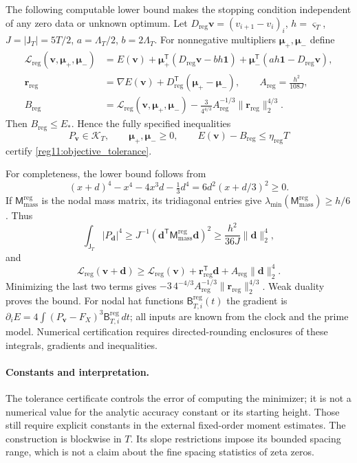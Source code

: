 The following computable lower bound makes the stopping condition
independent of any zero data or unknown optimum. Let
$D_{\mathrm{reg}}\mathbf v=(v_{i+1}-v_i)_i$, $h=\varsigma_T$,
$J=|\mathsf J_T|=5T/2$, $a=\Lambda_T/2$, $b=2\Lambda_T$.
For nonnegative multipliers $\boldsymbol\mu_+,\boldsymbol\mu_-$ define
\begin{equation}
\begin{split}
\mathscr L_{\mathrm{reg}}(\mathbf v,\boldsymbol\mu_+,\boldsymbol\mu_-)
&=E(\mathbf v)+\boldsymbol\mu_+^{\mathsf T}(D_{\mathrm{reg}}\mathbf v-bh\mathbf1)
+\boldsymbol\mu_-^{\mathsf T}(ah\mathbf1-D_{\mathrm{reg}}\mathbf v),\\
\mathbf r_{\mathrm{reg}}&=\nabla E(\mathbf v)+D_{\mathrm{reg}}^{\mathsf T}
(\boldsymbol\mu_+-\boldsymbol\mu_-),\qquad A_{\mathrm{reg}}=\frac{h^2}{108J},\\
B_{\mathrm{reg}}&=\mathscr L_{\mathrm{reg}}(\mathbf v,\boldsymbol\mu_+,\boldsymbol\mu_-)
-\frac3{4^{4/3}}A_{\mathrm{reg}}^{-1/3}\|\mathbf r_{\mathrm{reg}}\|_2^{4/3}.
\end{split}
\label{reg11:certificate}
\end{equation}
Then $B_{\mathrm{reg}}\le E_*$. Hence the fully specified inequalities
\begin{equation}
P_{\mathbf v}\in\mathcal K_T,\qquad
\boldsymbol\mu_+,\boldsymbol\mu_-\ge0,\qquad
E(\mathbf v)-B_{\mathrm{reg}}\le\eta_{\mathrm{reg}}T
\label{reg11:stopping}
\end{equation}
certify \eqref{reg11:objective_tolerance}.

For completeness, the lower bound follows from
\[
(x+d)^4-x^4-4x^3d-\tfrac13d^4=6d^2(x+d/3)^2\ge0.
\]
If $\mathsf M_{\mathrm{mass}}^{\mathrm{reg}}$ is the nodal mass matrix,
its tridiagonal entries give
$\lambda_{\min}(\mathsf M_{\mathrm{mass}}^{\mathrm{reg}})\ge h/6$. Thus
\[
\int_{\mathsf J_T}|P_{\mathbf d}|^4
\ge J^{-1}(\mathbf d^{\mathsf T}\mathsf M_{\mathrm{mass}}^{\mathrm{reg}}\mathbf d)^2
\ge\frac{h^2}{36J}\|\mathbf d\|_2^4,
\]
and
\[
\mathscr L_{\mathrm{reg}}(\mathbf v+\mathbf d)\ge
\mathscr L_{\mathrm{reg}}(\mathbf v)+\mathbf r_{\mathrm{reg}}^{\mathsf T}\mathbf d
+A_{\mathrm{reg}}\|\mathbf d\|_2^4.
\]
Minimizing the last two terms gives
$-3\,4^{-4/3}A_{\mathrm{reg}}^{-1/3}\|\mathbf r_{\mathrm{reg}}\|_2^{4/3}$.
Weak duality proves the bound. For nodal hat functions
$\mathsf B_{T,i}^{\mathrm{reg}}(t)$ the gradient is
$\partial_i E=4\int(P_{\mathbf v}-F_X)^3\mathsf B_{T,i}^{\mathrm{reg}}\,dt$;
all inputs are known
from the clock and the prime model. Numerical certification requires
directed-rounding enclosures of these integrals, gradients and inequalities.

\paragraph{Constants and interpretation.}
The tolerance certificate controls the error of computing the minimizer;
it is not a numerical value for the analytic accuracy constant or its
starting height. Those still require explicit constants in the external
fixed-order moment estimates. The construction is blockwise in $T$.
Its slope restrictions impose its bounded spacing range, which is not a
claim about the fine spacing statistics of zeta zeros.
